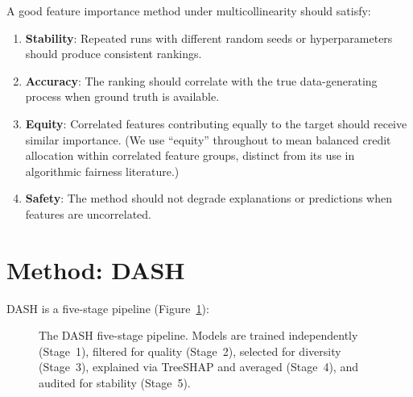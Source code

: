 \documentclass[10pt]{article}
\newcommand{\dash}{\textsc{DASH}}
\begin{document}
A good feature importance method under multicollinearity should satisfy:
\begin{enumerate}
  \item \textbf{Stability}: Repeated runs with different random seeds or
    hyperparameters should produce consistent rankings.
  \item \textbf{Accuracy}: The ranking should correlate with the true
    data-generating process when ground truth is available.
  \item \textbf{Equity}: Correlated features contributing equally to the
    target should receive similar importance. (We use ``equity'' throughout
    to mean balanced credit allocation within correlated feature groups,
    distinct from its use in algorithmic fairness literature.)
  \item \textbf{Safety}: The method should not degrade explanations or
    predictions when features are uncorrelated.
\end{enumerate}


\section{Method: DASH}
\label{sec:method}

\dash{} is a five-stage pipeline (Figure~\ref{fig:pipeline}):

\begin{figure}[htbp]
\centering
{}
\caption{The \dash{} five-stage pipeline. Models are trained independently
(Stage~1), filtered for quality (Stage~2), selected for diversity (Stage~3),
explained via TreeSHAP and averaged (Stage~4), and audited for stability
(Stage~5).}
\label{fig:pipeline}
\end{figure}
\end{document}
